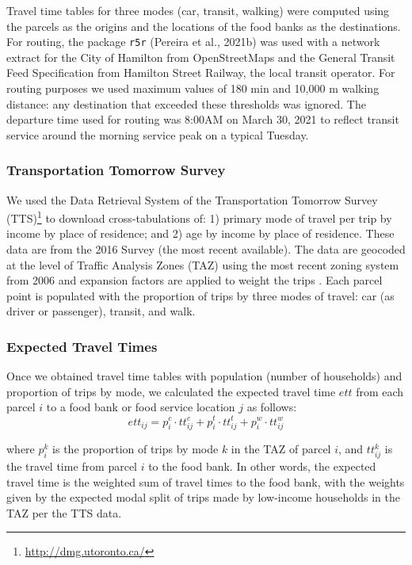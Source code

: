 \documentclass[]{elsarticle} %
\begin{document}
Travel time tables for three modes (car, transit, walking) were computed
using the parcels as the origins and the locations of the food banks as
the destinations. For routing, the package \texttt{r5r} (Pereira et al.,
2021b) was used with a network extract for the City of Hamilton from
OpenStreetMaps and the General Transit Feed Specification from Hamilton
Street Railway, the local transit operator. For routing purposes we used
maximum values of 180 min and 10,000 m walking distance: any destination
that exceeded these thresholds was ignored. The departure time used for
routing was 8:00AM on March 30, 2021 to reflect transit service around
the morning service peak on a typical Tuesday.

\hypertarget{transportation-tomorrow-survey}{%
\subsubsection{Transportation Tomorrow
Survey}\label{transportation-tomorrow-survey}}

We used the Data Retrieval System of the Transportation Tomorrow Survey
(TTS)\footnote{\url{http://dmg.utoronto.ca/}} to download
cross-tabulations of: 1) primary mode of travel per trip by income by
place of residence; and 2) age by income by place of residence. These
data are from the 2016 Survey (the most recent available). The data are
geocoded at the level of Traffic Analysis Zones (TAZ) using the most
recent zoning system from 2006 and expansion factors are applied to
weight the trips . Each parcel point is populated with the proportion of
trips by three modes of travel: car (as driver or passenger), transit,
and walk.

\hypertarget{expected-travel-times}{%
\subsubsection{Expected Travel Times}\label{expected-travel-times}}

Once we obtained travel time tables with population (number of
households) and proportion of trips by mode, we calculated the expected
travel time \(ett\) from each parcel \(i\) to a food bank or food
service location \(j\) as follows: \[
ett_{ij} = p^c_i\cdot tt^c_{ij} + p^t_i\cdot tt^t_{ij} + p^w_i\cdot tt^w_{ij}
\]

\noindent where \(p^k_i\) is the proportion of trips by mode \(k\) in
the TAZ of parcel \(i\), and \(tt^k_{ij}\) is the travel time from
parcel \(i\) to the food bank. In other words, the expected travel time
is the weighted sum of travel times to the food bank, with the weights
given by the expected modal split of trips made by low-income households
in the TAZ per the TTS data.
\end{document}
